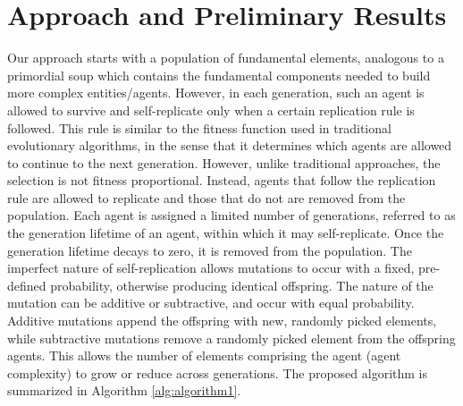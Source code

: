 \section{Approach and Preliminary Results}
\label{methods}
Our approach starts with a population of fundamental elements, analogous to a primordial soup \cite{haldane1929rationalist} which contains  the fundamental components needed to build more complex entities/agents. However, in each generation, such an agent is allowed to survive and self-replicate only when a certain replication rule is followed. This rule is similar to the fitness function used in traditional evolutionary algorithms, in the sense that it determines which agents are allowed to continue to the next generation. However, unlike traditional approaches, the selection is not fitness proportional. Instead, agents that follow the replication rule are allowed to replicate and those that do not are removed from the population. Each agent is assigned a limited number of generations, referred to as the generation lifetime of an agent, within which it may self-replicate. Once the generation lifetime decays to zero, it is removed from the population. The imperfect nature of self-replication allows mutations to occur with a fixed, pre-defined probability, otherwise producing identical offspring. The nature of the mutation can be additive or subtractive, and occur with equal probability. Additive mutations append the offspring with new, randomly picked elements, while subtractive mutations remove a randomly picked element from the offspring agents. This allows the number of elements comprising the agent (agent complexity) to grow or reduce across generations.
The proposed algorithm is summarized in Algorithm \ref{alg:algorithm1}.%

